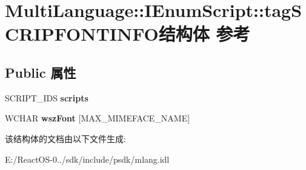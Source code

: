 \hypertarget{struct_multi_language_1_1_i_enum_script_1_1tag_s_c_r_i_p_f_o_n_t_i_n_f_o}{}\section{Multi\+Language\+:\+:I\+Enum\+Script\+:\+:tag\+S\+C\+R\+I\+P\+F\+O\+N\+T\+I\+N\+F\+O结构体 参考}
\label{struct_multi_language_1_1_i_enum_script_1_1tag_s_c_r_i_p_f_o_n_t_i_n_f_o}
\subsection*{Public 属性}
\begin{DoxyCompactItemize}
\item 
\mbox{\label{struct_multi_language_1_1_i_enum_script_1_1tag_s_c_r_i_p_f_o_n_t_i_n_f_o_a6bf8fa15d028205da450db4065f84443}} 
S\+C\+R\+I\+P\+T\+\_\+\+I\+DS {\bfseries scripts}
\item 
\mbox{\label{struct_multi_language_1_1_i_enum_script_1_1tag_s_c_r_i_p_f_o_n_t_i_n_f_o_a27f9951698d745fca855de718f4453bf}} 
W\+C\+H\+AR {\bfseries wsz\+Font} \mbox{[}M\+A\+X\+\_\+\+M\+I\+M\+E\+F\+A\+C\+E\+\_\+\+N\+A\+ME\mbox{]}
\end{DoxyCompactItemize}


该结构体的文档由以下文件生成\+:\begin{DoxyCompactItemize}
\item 
E\+:/\+React\+O\+S-\/0../sdk/include/psdk/mlang.\+idl\end{DoxyCompactItemize}
